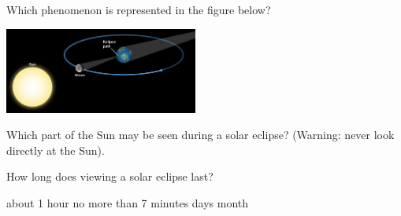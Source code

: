 \documentclass[addpoints]{exam}
\begin{document}
\begin{questions}


\question
Which phenomenon is represented in the figure below?
\vspace{1em}

\begin{minipage}{0.4\textwidth}
    \centering
\end{minipage}%
\begin{minipage}{0.5\textwidth}
    \centering
    \includegraphics[width=2.5in]{Figures/Figure4.22.jpg}
\end{minipage}
\vspace{1em}

\question
Which part of the Sun may be seen during a solar eclipse? (Warning: never look directly at the Sun).


\question
How long does viewing a solar eclipse last?

\begin{choices}
    \choice about 1 hour
    \correctchoice no more than 7 minutes
     days
     month
\end{choices}



\end{questions}
\end{document}

